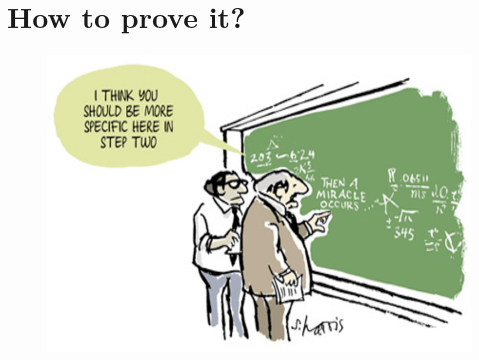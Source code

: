 \chapter{How to prove it?}
\begin{figure}[htp]
	\centering
	\includegraphics[width=\linewidth]{Assets/0_W-tEtGVYH9eM9HNx}
	\caption{}
	\label{fig:specific}
\end{figure}

